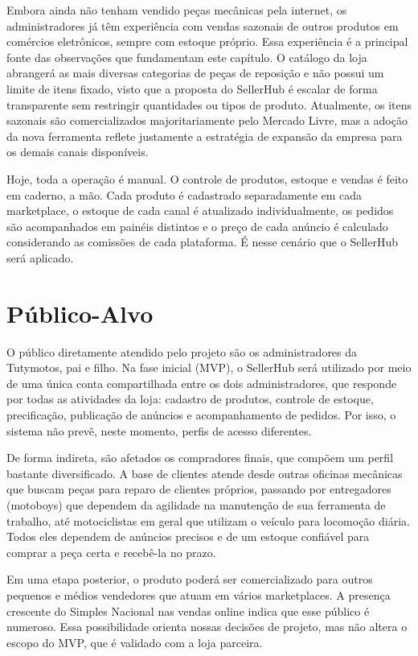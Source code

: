 Embora ainda não tenham vendido peças mecânicas pela internet, os administradores já têm experiência com vendas sazonais de outros produtos em comércios eletrônicos, sempre com estoque próprio. Essa experiência é a principal fonte das observações que fundamentam este capítulo. O catálogo da loja abrangerá as mais diversas categorias de peças de reposição e não possui um limite de itens fixado, visto que a proposta do SellerHub é escalar de forma transparente sem restringir quantidades ou tipos de produto. Atualmente, os itens sazonais são comercializados majoritariamente pelo Mercado Livre, mas a adoção da nova ferramenta reflete justamente a estratégia de expansão da empresa para os demais canais disponíveis.

Hoje, toda a operação é manual. O controle de produtos, estoque e vendas é feito em caderno, a mão. Cada produto é cadastrado separadamente em cada marketplace, o estoque de cada canal é atualizado individualmente, os pedidos são acompanhados em painéis distintos e o preço de cada anúncio é calculado considerando as comissões de cada plataforma. É nesse cenário que o SellerHub será aplicado.

\section{Público-Alvo}
\label{sec:publico-alvo}

O público diretamente atendido pelo projeto são os administradores da Tutymotos, pai e filho. Na fase inicial (MVP), o SellerHub será utilizado por meio de uma única conta compartilhada entre os dois administradores, que responde por todas as atividades da loja: cadastro de produtos, controle de estoque, precificação, publicação de anúncios e acompanhamento de pedidos. Por isso, o sistema não prevê, neste momento, perfis de acesso diferentes.

De forma indireta, são afetados os compradores finais, que compõem um perfil bastante diversificado. A base de clientes atende desde outras oficinas mecânicas que buscam peças para reparo de clientes próprios, passando por entregadores (motoboys) que dependem da agilidade na manutenção de sua ferramenta de trabalho, até motociclistas em geral que utilizam o veículo para locomoção diária. Todos eles dependem de anúncios precisos e de um estoque confiável para comprar a peça certa e recebê-la no prazo.

Em uma etapa posterior, o produto poderá ser comercializado para outros pequenos e médios vendedores que atuam em vários marketplaces. A presença crescente do Simples Nacional nas vendas online \cite{fecomercio2026} indica que esse público é numeroso. Essa possibilidade orienta nossas decisões de projeto, mas não altera o escopo do MVP, que é validado com a loja parceira.

